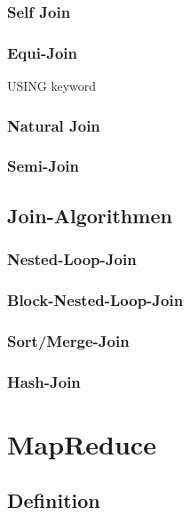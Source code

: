 \documentclass[a4paper]{article}
\begin{document}
\subsubsection{Self Join}

\subsubsection{Equi-Join}
USING keyword

\subsubsection{Natural Join}

\subsubsection{Semi-Join}

\newpage

\subsection{Join-Algorithmen}

\subsubsection{Nested-Loop-Join}

\subsubsection{Block-Nested-Loop-Join}

\subsubsection{Sort/Merge-Join}

\subsubsection{Hash-Join}

\newpage

\section{MapReduce}

\subsection{Definition}
\end{document}
